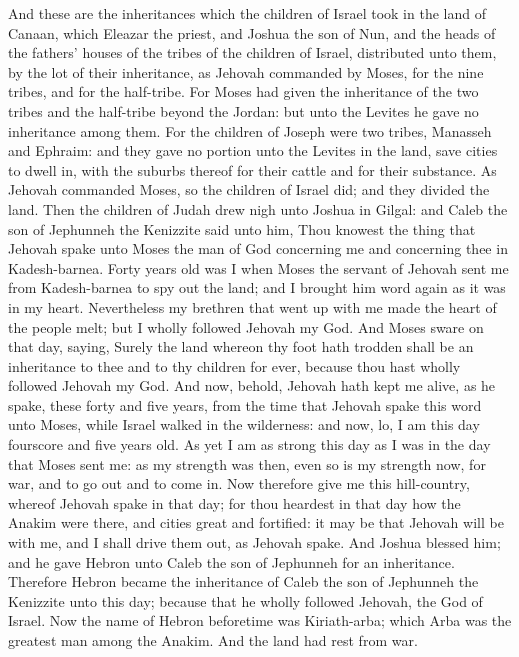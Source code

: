 And these are the inheritances which the children of Israel took in the land of Canaan, which Eleazar the priest, and Joshua the son of Nun, and the heads of the fathers’ houses of the tribes of the children of Israel, distributed unto them, by the lot of their inheritance, as Jehovah commanded by Moses, for the nine tribes, and for the half-tribe. For Moses had given the inheritance of the two tribes and the half-tribe beyond the Jordan: but unto the Levites he gave no inheritance among them. For the children of Joseph were two tribes, Manasseh and Ephraim: and they gave no portion unto the Levites in the land, save cities to dwell in, with the suburbs thereof for their cattle and for their substance. As Jehovah commanded Moses, so the children of Israel did; and they divided the land.  Then the children of Judah drew nigh unto Joshua in Gilgal: and Caleb the son of Jephunneh the Kenizzite said unto him, Thou knowest the thing that Jehovah spake unto Moses the man of God concerning me and concerning thee in Kadesh-barnea. Forty years old was I when Moses the servant of Jehovah sent me from Kadesh-barnea to spy out the land; and I brought him word again as it was in my heart. Nevertheless my brethren that went up with me made the heart of the people melt; but I wholly followed Jehovah my God. And Moses sware on that day, saying, Surely the land whereon thy foot hath trodden shall be an inheritance to thee and to thy children for ever, because thou hast wholly followed Jehovah my God. And now, behold, Jehovah hath kept me alive, as he spake, these forty and five years, from the time that Jehovah spake this word unto Moses, while Israel walked in the wilderness: and now, lo, I am this day fourscore and five years old. As yet I am as strong this day as I was in the day that Moses sent me: as my strength was then, even so is my strength now, for war, and to go out and to come in. Now therefore give me this hill-country, whereof Jehovah spake in that day; for thou heardest in that day how the Anakim were there, and cities great and fortified: it may be that Jehovah will be with me, and I shall drive them out, as Jehovah spake.  And Joshua blessed him; and he gave Hebron unto Caleb the son of Jephunneh for an inheritance. Therefore Hebron became the inheritance of Caleb the son of Jephunneh the Kenizzite unto this day; because that he wholly followed Jehovah, the God of Israel. Now the name of Hebron beforetime was Kiriath-arba; which Arba was the greatest man among the Anakim. And the land had rest from war. 

